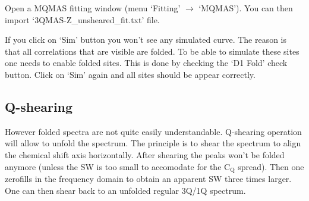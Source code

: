 \documentclass[11pt,a4paper]{article}
\begin{document}
Open a MQMAS fitting window (menu `Fitting' $\longrightarrow$ `MQMAS'). You can then import `3QMAS-Z\_unsheared\_fit.txt' file.

If you click on `Sim' button you won't see any simulated curve. The reason is that all correlations that are visible are 
folded. To be able to simulate these sites one needs to enable folded sites. This is done by checking the `D1 Fold' check 
button. Click on `Sim' again and all sites should be appear correctly.

\subsection{Q-shearing}

However folded spectra are not quite easily understandable. Q-shearing operation will allow to unfold the spectrum. The principle is 
to shear the spectrum  to align the chemical shift axis horizontally. After shearing the peaks won't be folded anymore (unless the 
SW is too small to accomodate for the C$_\text{Q}$ spread). Then one zerofills in the frequency domain to obtain an apparent SW three 
times larger. One can then shear back to an unfolded regular 3Q/1Q spectrum.
\end{document}
